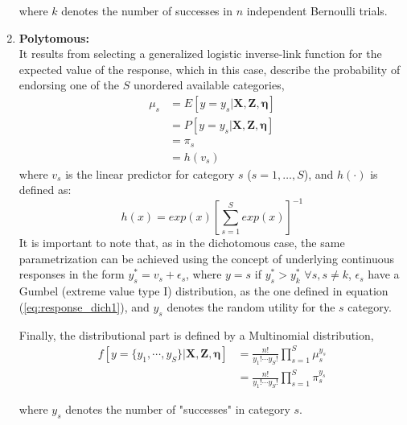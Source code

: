 \begin{enumerate}
	where $k$ denotes the number of successes in $n$ independent Bernoulli trials.
	
	
			
	\item \textbf{Polytomous:} \\	
	It results from selecting a generalized logistic inverse-link function \citep{Bock_1972} for the expected value of the response, which in this case, describe the probability of endorsing one of the $S$ unordered available categories,
	\begin{equation} \label{eq:link_poly}
		\begin{split}
		\mu_{s} &= E[y=y_{s} | \mathbf{X}, \mathbf{Z}, \pmb{\eta}] \\
		&= P[y=y_{s} | \mathbf{X}, \mathbf{Z}, \pmb{\eta}] \\
		& = \pi_{s} \\
		&= h(v_{s})
		\end{split}
	\end{equation}	
	where $v_{s}$ is the linear predictor for category $s$ ($s=1, \dots, S$), and $h(\cdot)$ is defined as:
	\begin{equation} \label{eq:response_poly}
		h(x) = exp(x)\left[\sum_{s=1}^{S} exp(x)\right]^{-1}
	\end{equation}
	It is important to note that, as in the dichotomous case, the same parametrization can be achieved using the concept of underlying continuous responses in the form $y_{s}^{*} = v_{s} + \epsilon_{s}$, where $y = s$ if $y_{s}^{*} > y_{k}^{*}$ $\forall s, s \neq k$, $\epsilon_{s}$ have a Gumbel (extreme value type I) distribution, as the one defined in equation (\ref{eq:response_dich1}), and $y_{s}$ denotes the random utility for the $s$ category.
	
	
	Finally, the distributional part is defined by a Multinomial distribution,
	\begin{equation} \label{eq:dist_poly}
		\begin{split}
		f[y=\{y_{1}, \cdots, y_{S}\} | \mathbf{X}, \mathbf{Z}, \pmb{\eta}] &= \frac{n!}{y_{1}! \cdots y_{S}!} \prod_{s=1}^{S} \mu_{s}^{y_{s}} \\
		&= \frac{n!}{y_{1}! \cdots y_{S}!} \prod_{s=1}^{S} \pi_{s}^{y_{s}}
		\end{split}
	\end{equation}
	
	where $y_{s}$ denotes the number of "successes" in category $s$.

	
	

\end{enumerate}
